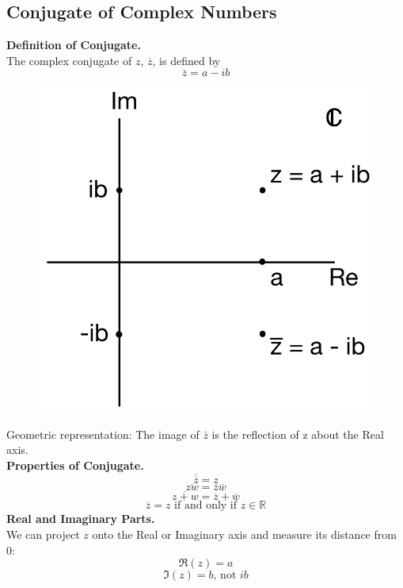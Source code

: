\documentclass[11pt]{article}
\begin{document}
\subsection{Conjugate of Complex Numbers} 
\newcommand*\conj[1]{\overline{#1}}
\textbf{Definition of Conjugate.} \\
The complex conjugate of $z$, $\conj{z}$, is defined by 
$$\conj{z} = a - ib$$ 
\begin{figure}[H]
\includegraphics[scale = 0.19]{1_2}
\centering
\end{figure}
Geometric representation: The image of $\bar z$ is the reflection of z about the Real axis. \\
\newline
\textbf{Properties of Conjugate.} \\
$$\conj{\conj{z}} = z$$
$$\conj{zw} = \conj{z}\conj{w}$$
$$\conj{z + w} = \conj{z} + \conj{w}$$
\begin{equation*}
\overline{z} = z \mbox{ if and only if } z \in \mathbb{R}
\end{equation*}
\textbf{Real and Imaginary Parts.} \\
\newline
\noindent We can project $z$ onto the Real or Imaginary axis and measure its distance from 0: 
$$\Re(z) = a$$
\begin{equation*}
\Im(z) = b \mbox{, not } ib
\end{equation*}
\end{document}
